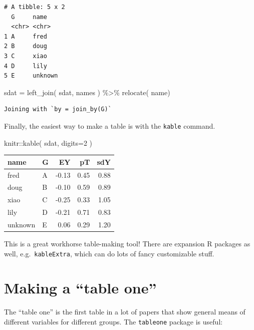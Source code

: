 \documentclass[
  letterpaper,
  DIV=11,
  numbers=noendperiod]{scrreprt}
\newenvironment{Shaded}{}{}
\newcommand{\AttributeTok}[1]{\textcolor[rgb]{0.49,0.56,0.16}{#1}}
\newcommand{\DecValTok}[1]{\textcolor[rgb]{0.25,0.63,0.44}{#1}}
\newcommand{\FunctionTok}[1]{\textcolor[rgb]{0.02,0.16,0.49}{#1}}
\newcommand{\NormalTok}[1]{#1}
\newcommand{\OtherTok}[1]{\textcolor[rgb]{0.00,0.44,0.13}{#1}}
\newcommand{\SpecialCharTok}[1]{\textcolor[rgb]{0.25,0.44,0.63}{#1}}
\begin{document}
\begin{verbatim}
# A tibble: 5 x 2
  G     name   
  <chr> <chr>  
1 A     fred   
2 B     doug   
3 C     xiao   
4 D     lily   
5 E     unknown
\end{verbatim}

\begin{Shaded}
\begin{Highlighting}[]
\NormalTok{sdat }\OtherTok{=} \FunctionTok{left\_join}\NormalTok{( sdat, names ) }\SpecialCharTok{\%\textgreater{}\%}
    \FunctionTok{relocate}\NormalTok{( name)}
\end{Highlighting}
\end{Shaded}

\begin{verbatim}
Joining with `by = join_by(G)`
\end{verbatim}

Finally, the easiest way to make a table is with the \texttt{kable}
command.

\begin{Shaded}
\begin{Highlighting}[]
\NormalTok{knitr}\SpecialCharTok{::}\FunctionTok{kable}\NormalTok{( sdat, }\AttributeTok{digits=}\DecValTok{2}\NormalTok{ )}
\end{Highlighting}
\end{Shaded}

\begin{longtable}[]{@{}llrrr@{}}
\toprule\noalign{}
name & G & EY & pT & sdY \\
\midrule\noalign{}
\endhead
\bottomrule\noalign{}
\endlastfoot
fred & A & -0.13 & 0.45 & 0.88 \\
doug & B & -0.10 & 0.59 & 0.89 \\
xiao & C & -0.25 & 0.33 & 1.05 \\
lily & D & -0.21 & 0.71 & 0.83 \\
unknown & E & 0.06 & 0.29 & 1.20 \\
\end{longtable}

This is a great workhorse table-making tool! There are expansion R
packages as well, e.g.~\texttt{kableExtra}, which can do lots of fancy
customizable stuff.

\section{Making a ``table one''}\label{making-a-table-one}

The ``table one'' is the first table in a lot of papers that show
general means of different variables for different groups. The
\texttt{tableone} package is useful:
\end{document}
